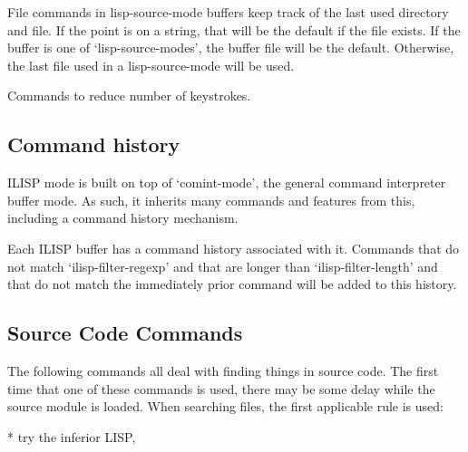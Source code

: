 


File commands in lisp-source-mode buffers keep track of the last used
directory and file. If the point is on a string, that will be the
default if the file exists. If the buffer is one of 
`lisp-source-modes', the buffer file will be the default. Otherwise,
the last file used in a lisp-source-mode will be used.




Commands to reduce number of keystrokes.



\subsection{Command history}

ILISP mode is built on top of `comint-mode', the general command  
interpreter buffer mode. As such, it inherits many 
commands and features from this, including a command history mechanism.

Each ILISP buffer has a command history associated with it. Commands 
that do not match `ilisp-filter-regexp' and that are longer than 
`ilisp-filter-length' and that do not match the immediately prior 
command will be added to this history.



\subsection{Source Code Commands}

   The following commands all deal with finding things in source code.
The first time that one of these commands is used, there may be some
delay while the source module is loaded.  When searching files, the
first applicable rule is used:

   * try the inferior LISP,

